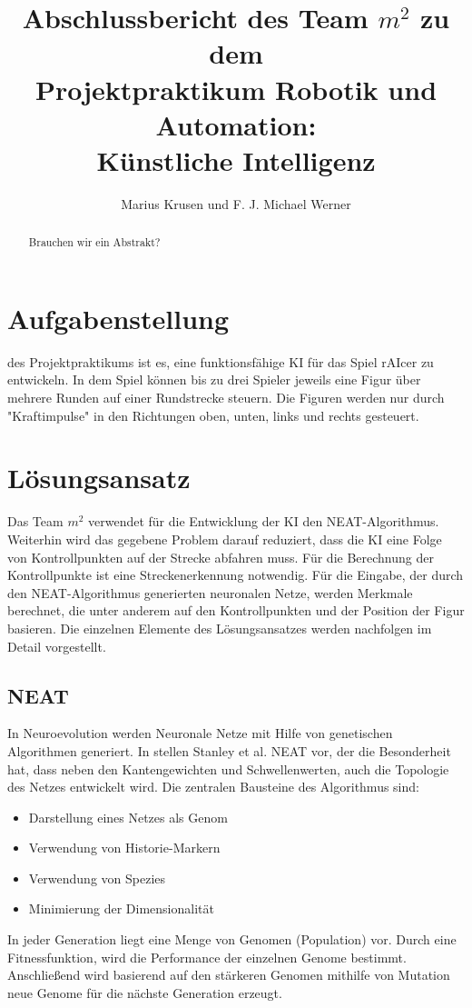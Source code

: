 \documentclass[11pt,final,journal,a4paper,towside,towcolumn]{IEEEtran}
\begin{document}
\begin{acronym}
\end{acronym}
	
\title{Abschlussbericht des Team $m^2$ zu dem \\Projektpraktikum Robotik und Automation:\\Künstliche Intelligenz}
\author{Marius Krusen und F. J. Michael Werner}
\maketitle

\begin{abstract}
Brauchen wir ein Abstrakt?
\end{abstract}

\section{Aufgabenstellung}
 des Projektpraktikums ist es, eine funktionsfähige  \ac{KI} für das Spiel rAIcer zu entwickeln. In dem Spiel können bis zu drei Spieler jeweils eine Figur über mehrere Runden auf einer Rundstrecke steuern. Die Figuren werden nur durch "Kraftimpulse" in den Richtungen oben, unten, links und rechts gesteuert.

\section{Lösungsansatz}
Das Team $m^2$ verwendet für die Entwicklung der \ac{KI} den \ac{NEAT}-Algorithmus. Weiterhin wird das gegebene Problem darauf reduziert, dass die \ac{KI} eine Folge von Kontrollpunkten auf der Strecke abfahren muss. Für die Berechnung der Kontrollpunkte ist eine Streckenerkennung notwendig. Für die Eingabe, der durch den \ac{NEAT}-Algorithmus generierten neuronalen Netze, werden Merkmale berechnet, die unter anderem auf den Kontrollpunkten und der Position der Figur basieren. Die einzelnen Elemente des Lösungsansatzes werden nachfolgen im Detail vorgestellt.
\subsection{NEAT}
In Neuroevolution werden Neuronale Netze mit Hilfe von genetischen Algorithmen generiert. In \cite{stanley:gecco02-efficient} stellen Stanley et al. \ac{NEAT} vor, der die Besonderheit hat, dass neben den Kantengewichten und Schwellenwerten, auch die Topologie des Netzes entwickelt wird.
Die zentralen Bausteine des Algorithmus sind:
\begin{itemize}
\item Darstellung eines Netzes als Genom	
\item Verwendung von Historie-Markern
\item Verwendung von Spezies
\item Minimierung der Dimensionalität
\end{itemize}
In jeder Generation liegt eine Menge von Genomen (Population) vor. Durch eine Fitnessfunktion, wird die Performance der einzelnen Genome bestimmt. Anschließend wird basierend auf den stärkeren Genomen mithilfe von Mutation neue Genome für die nächste Generation erzeugt.
\end{document}
